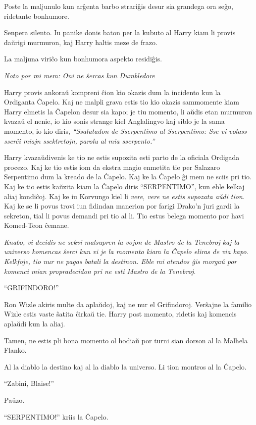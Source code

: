 Poste la maljunulo kun arĝenta barbo strariĝis desur sia grandega ora
seĝo, ridetante bonhumore.

Senpera silento. Iu panike donis baton per la kubuto al Harry kiam li
provis daŭrigi murmuron, kaj Harry haltis meze de frazo.

La maljuna viriĉo kun bonhumora aspekto residiĝis.

\emph{Noto por mi mem: Oni ne ŝercas kun Dumbledore}

Harry provis ankoraŭ kompreni ĉion kio okazis dum la incidento kun la
Ordiganta Ĉapelo. Kaj ne malpli grava estis tio kio okazis sammomente
kiam Harry elmetis la Ĉapelon desur sia kapo; je tiu momento, li aŭdis
etan murmuron kvazaŭ el nenie, io kio sonis strange kiel Anglalingvo
kaj siblo je la sama momento, io kio diris, \emph{``Ssalutadon de
  Sserpentimo al Sserpentimo: Sse vi volass sserĉi miajn ssektretojn,
  parolu al mia sserpento.''}

Harry kvazaŭdivenis ke tio ne estis supozita esti parto de la oficiala
Ordigada procezo. Kaj ke tio estis iom da ekstra magio enmetita tie
per Salazaro Serpentimo dum la kreado de la Ĉapelo. Kaj ke la Ĉapelo
ĝi mem ne sciis pri tio. Kaj ke tio estis kaŭzita kiam la Ĉapelo diris
``SERPENTIMO'', kun eble kelkaj aliaj kondiĉoj. Kaj ke iu Korvungo
kiel li \emph{vere, vere ne estis supozata aŭdi tion.}  Kaj ke se li
povus trovi iun fidindan manerion por farigi Drako'n ĵuri gardi la
sekreton, tial li povus demandi pri tio al li. Tio estus belega
momento por havi Komed-Teon ĉemane.

\emph{Knabo, vi decidis ne sekvi malsupren la vojon de Mastro de la
  Tenebroj kaj la universo komencas ŝerci kun vi je la momento kiam la
  Ĉapelo eliras de via kapo. Kelkfoje, tio nur ne pagas batali la
  destinon. Eble mi atendos ĝis morgaŭ por komenci mian propradecidon
  pri ne esti Mastro de la Tenebroj.}

``GRIFINDORO!''

Ron Wizle akiris multe da aplaŭdoj, kaj ne nur el
Grifindoroj. Verŝajne la familio Wizle estis vaste ŝatita ĉirkaŭ
tie. Harry post momento, ridetis kaj komencis aplaŭdi kun la aliaj.

Tamen, ne estis pli bona momento ol hodiaŭ por turni sian dorson al la
Malhela Flanko.

Al la diablo la destino kaj al la diablo la universo. Li tion montros
al la Ĉapelo.

``Zabini, Blaise!''

Paŭzo.

``SERPENTIMO!'' kriis la Ĉapelo.

